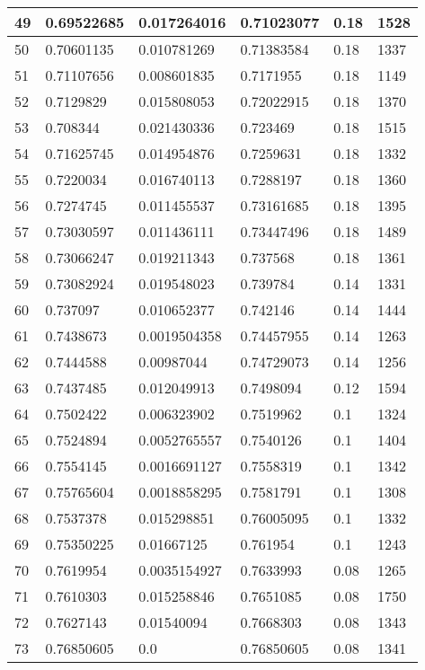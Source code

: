 \begin{longtable}{|l|l|l|l|l|l|}
49 & 0.69522685 & 0.017264016 & 0.71023077 & 0.18 & 1528 \\ \hline 
50 & 0.70601135 & 0.010781269 & 0.71383584 & 0.18 & 1337 \\ \hline 
51 & 0.71107656 & 0.008601835 & 0.7171955 & 0.18 & 1149 \\ \hline 
52 & 0.7129829 & 0.015808053 & 0.72022915 & 0.18 & 1370 \\ \hline 
53 & 0.708344 & 0.021430336 & 0.723469 & 0.18 & 1515 \\ \hline 
54 & 0.71625745 & 0.014954876 & 0.7259631 & 0.18 & 1332 \\ \hline 
55 & 0.7220034 & 0.016740113 & 0.7288197 & 0.18 & 1360 \\ \hline 
56 & 0.7274745 & 0.011455537 & 0.73161685 & 0.18 & 1395 \\ \hline 
57 & 0.73030597 & 0.011436111 & 0.73447496 & 0.18 & 1489 \\ \hline 
58 & 0.73066247 & 0.019211343 & 0.737568 & 0.18 & 1361 \\ \hline 
59 & 0.73082924 & 0.019548023 & 0.739784 & 0.14 & 1331 \\ \hline 
60 & 0.737097 & 0.010652377 & 0.742146 & 0.14 & 1444 \\ \hline 
61 & 0.7438673 & 0.0019504358 & 0.74457955 & 0.14 & 1263 \\ \hline 
62 & 0.7444588 & 0.00987044 & 0.74729073 & 0.14 & 1256 \\ \hline 
63 & 0.7437485 & 0.012049913 & 0.7498094 & 0.12 & 1594 \\ \hline 
64 & 0.7502422 & 0.006323902 & 0.7519962 & 0.1 & 1324 \\ \hline 
65 & 0.7524894 & 0.0052765557 & 0.7540126 & 0.1 & 1404 \\ \hline 
66 & 0.7554145 & 0.0016691127 & 0.7558319 & 0.1 & 1342 \\ \hline 
67 & 0.75765604 & 0.0018858295 & 0.7581791 & 0.1 & 1308 \\ \hline 
68 & 0.7537378 & 0.015298851 & 0.76005095 & 0.1 & 1332 \\ \hline 
69 & 0.75350225 & 0.01667125 & 0.761954 & 0.1 & 1243 \\ \hline 
70 & 0.7619954 & 0.0035154927 & 0.7633993 & 0.08 & 1265 \\ \hline 
71 & 0.7610303 & 0.015258846 & 0.7651085 & 0.08 & 1750 \\ \hline 
72 & 0.7627143 & 0.01540094 & 0.7668303 & 0.08 & 1343 \\ \hline 
73 & 0.76850605 & 0.0 & 0.76850605 & 0.08 & 1341 \\ \hline 

\end{longtable}
